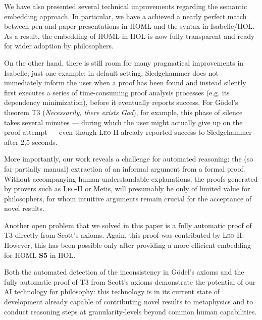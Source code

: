 \documentclass{article}
\begin{document}
We have also presented several technical improvements regarding the
semantic embedding approach. In particular, we have a achieved a
nearly perfect match between pen and paper presentations in HOML and
the syntax in Isabelle/HOL. As a result, the embedding of HOML in HOL
is now fully transparent and ready for wider adoption by
philosophers.

On the other hand, there is still room for many pragmatical
improvements in Isabelle; just one example: in default setting,
Sledgehammer does not immediately inform the user when a proof has
been found and instead silently first executes a series of
time-consuming proof analysis processes (e.g. its dependency
minimization), before it eventually reports success. For G\"odel's
theorem T3 (\textit{Necessarily, there exists God}), for example, this
phase of silence takes several minutes --- during which the user might
actually give up on the proof attempt --- even though \textsc{Leo-II} already
reported success to Sledgehammer after 2,5 seconds.

More importantly, our work reveals a challenge for automated reasoning:
the (so far partially manual) extraction of an informal argument from a formal proof. 
Without accompanying human-understandable explanations,
the proofs generated by provers such as \textsc{Leo-II} or Metis, will
presumably be only of limited value for philosophers, for whom intuitive
arguments remain crucial for the acceptance of novel results.

Another open problem that we solved in this paper is a fully automatic
proof of T3 directly from Scott's axioms. Again, this proof was
contributed by \textsc{Leo-II}. However, this has been possible only
after providing a more efficient embedding for HOML \textbf{S5} in HOL. 

Both the automated detection of the inconsistency in G\"odel's axioms
and the fully automatic proof of T3 from Scott's axioms demonstrate
the potential of our AI technology for philosophy: this technology is
in its current state of development already capable of contributing novel results to
metaphysics and to conduct reasoning steps at granularity-levels
beyond common human capabilities.  %




\end{document}
